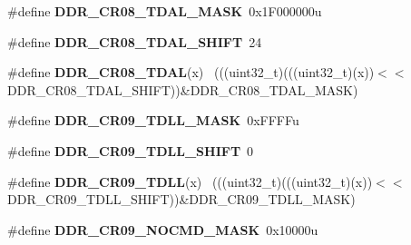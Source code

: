 \begin{DoxyCompactItemize}
\item 
\hypertarget{group___d_d_r___register___masks_ga0e9baa6f0bd549e4d8192d95240cf0c3}{}\#define {\bfseries D\+D\+R\+\_\+\+C\+R08\+\_\+\+T\+D\+A\+L\+\_\+\+M\+A\+S\+K}~0x1\+F000000u\label{group___d_d_r___register___masks_ga0e9baa6f0bd549e4d8192d95240cf0c3}

\item 
\hypertarget{group___d_d_r___register___masks_ga59167e7e956066d2afcafdfa58ccdecb}{}\#define {\bfseries D\+D\+R\+\_\+\+C\+R08\+\_\+\+T\+D\+A\+L\+\_\+\+S\+H\+I\+F\+T}~24\label{group___d_d_r___register___masks_ga59167e7e956066d2afcafdfa58ccdecb}

\item 
\hypertarget{group___d_d_r___register___masks_ga437ed233a8d7b53346a49fbfb02faa01}{}\#define {\bfseries D\+D\+R\+\_\+\+C\+R08\+\_\+\+T\+D\+A\+L}(x)                                              ~(((uint32\+\_\+t)(((uint32\+\_\+t)(x))$<$$<$D\+D\+R\+\_\+\+C\+R08\+\_\+\+T\+D\+A\+L\+\_\+\+S\+H\+I\+F\+T))\&D\+D\+R\+\_\+\+C\+R08\+\_\+\+T\+D\+A\+L\+\_\+\+M\+A\+S\+K)\label{group___d_d_r___register___masks_ga437ed233a8d7b53346a49fbfb02faa01}

\item 
\hypertarget{group___d_d_r___register___masks_gabeb52eb283fe966e8440ffd9046987b4}{}\#define {\bfseries D\+D\+R\+\_\+\+C\+R09\+\_\+\+T\+D\+L\+L\+\_\+\+M\+A\+S\+K}~0x\+F\+F\+F\+Fu\label{group___d_d_r___register___masks_gabeb52eb283fe966e8440ffd9046987b4}

\item 
\hypertarget{group___d_d_r___register___masks_ga776606291af0cbb64295525bfdcd51f5}{}\#define {\bfseries D\+D\+R\+\_\+\+C\+R09\+\_\+\+T\+D\+L\+L\+\_\+\+S\+H\+I\+F\+T}~0\label{group___d_d_r___register___masks_ga776606291af0cbb64295525bfdcd51f5}

\item 
\hypertarget{group___d_d_r___register___masks_gadde000f325504faf2cd54511498f81ab}{}\#define {\bfseries D\+D\+R\+\_\+\+C\+R09\+\_\+\+T\+D\+L\+L}(x)                                              ~(((uint32\+\_\+t)(((uint32\+\_\+t)(x))$<$$<$D\+D\+R\+\_\+\+C\+R09\+\_\+\+T\+D\+L\+L\+\_\+\+S\+H\+I\+F\+T))\&D\+D\+R\+\_\+\+C\+R09\+\_\+\+T\+D\+L\+L\+\_\+\+M\+A\+S\+K)\label{group___d_d_r___register___masks_gadde000f325504faf2cd54511498f81ab}

\item 
\hypertarget{group___d_d_r___register___masks_ga82c69349792c9b06d35fb2b6395114ce}{}\#define {\bfseries D\+D\+R\+\_\+\+C\+R09\+\_\+\+N\+O\+C\+M\+D\+\_\+\+M\+A\+S\+K}~0x10000u\label{group___d_d_r___register___masks_ga82c69349792c9b06d35fb2b6395114ce}


\end{DoxyCompactItemize}
